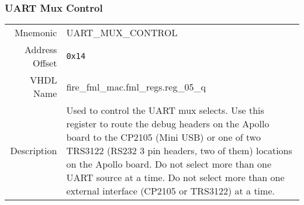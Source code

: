 \subsubsection{UART Mux Control}
\begin{tabular}{ r | p{350px} }
  Mnemonic       & UART\_MUX\_CONTROL                  \\
  Address Offset & \texttt{0x14}                       \\
  VHDL Name      & fire\_fml\_mac.fml\_regs.reg\_05\_q \\ \hline

  Description &
  Used to control the UART mux selects. Use this register to route the
  debug headers on the Apollo board to the CP2105 (Mini USB) or one of
  two TRS3122 (RS232 3 pin headers, two of them) locations on the
  Apollo board. Do not select more than one UART source at a time. Do
  not select more than one external interface (CP2105 or TRS3122) at a
  time.
\end{tabular}
\\
